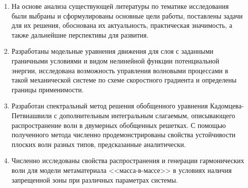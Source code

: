 


\begin{enumerate}
  \item На основе анализа существующей литературы по тематике исследования были выбраны и сформулированы основные цели работы, поставлены задачи для их решения, обоснована их актуальность, практическая значимость, а также дальнейшие перспективы для развития.
  \item Разработаны модельные уравнения движения для слоя с заданными граничными условиями и видом нелинейной функции потенциальной энергии, исследована возможность управления волновыми процессами в такой механической системе по схеме скоростного градиента и определены границы применимости. 
  \item Разработан спектральный метод решения обобщенного уравнения Кадомцева-Петвиашвили с дополнительным интегральным слагаемым, описывающего распространение волн в двумерных обобщенных решетках. С помощью полученного метода численно продемонстрированы свойства устойчивости плоских волн разных типов, предсказанные аналитически. 
  \item Численно исследованы свойства распространения и генерации гармонических волн для модели метаматериала <<масса-в-массе>> в условиях наличия запрещенной зоны при различных параметрах системы. 
\end{enumerate}
